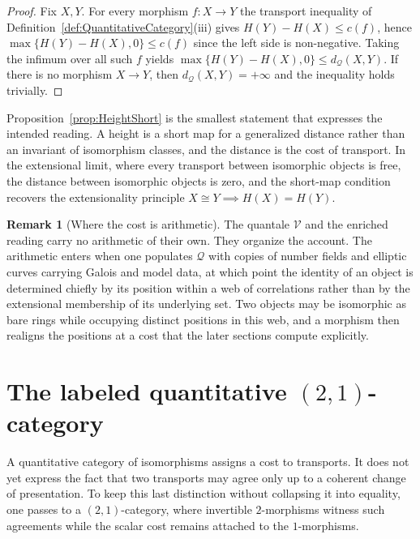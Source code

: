 \documentclass[10pt, reqno]{amsart}
\theoremstyle{plain}
\theoremstyle{definition}
\newtheorem{remark}[theorem]{Remark}
\theoremstyle{plain}
\begin{document}
\begin{proof}
Fix $X,Y$. For every morphism $f \colon X \to Y$ the transport inequality of Definition~\ref{def:QuantitativeCategory}(iii) gives $H(Y) - H(X) \le c(f)$, hence $\max\{H(Y) - H(X),0\} \le c(f)$ since the left side is non-negative. Taking the infimum over all such $f$ yields $\max\{H(Y) - H(X),0\} \le d_{\mathcal{Q}}(X,Y)$. If there is no morphism $X \to Y$, then $d_{\mathcal{Q}}(X,Y) = +\infty$ and the inequality holds trivially.
\end{proof}

Proposition~\ref{prop:HeightShort} is the smallest statement that expresses the intended reading. A height is a short map for a generalized distance rather than an invariant of isomorphism classes, and the distance is the cost of transport. In the extensional limit, where every transport between isomorphic objects is free, the distance between isomorphic objects is zero, and the short-map condition recovers the extensionality principle $X \cong Y \implies H(X) = H(Y)$.

\begin{remark}[Where the cost is arithmetic]\label{rem:CostArithmetic}
The quantale $\mathcal{V}$ and the enriched reading carry no arithmetic of their own. They organize the account. The arithmetic enters when one populates $\mathcal{Q}$ with copies of number fields and elliptic curves carrying Galois and model data, at which point the identity of an object is determined chiefly by its position within a web of correlations rather than by the extensional membership of its underlying set. Two objects may be isomorphic as bare rings while occupying distinct positions in this web, and a morphism then realigns the positions at a cost that the later sections compute explicitly.
\end{remark}


\section{The labeled quantitative \texorpdfstring{$(2,1)$}{(2,1)}-category}\label{sec:UniverseAFormal}

A quantitative category of isomorphisms assigns a cost to transports. It does not yet express the fact that two transports may agree only up to a coherent change of presentation. To keep this last distinction without collapsing it into equality, one passes to a $(2,1)$-category, where invertible $2$-morphisms witness such agreements while the scalar cost remains attached to the $1$-morphisms.
\end{document}
